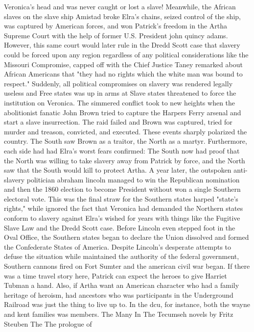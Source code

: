 \documentclass[12pt]{book}
\begin{document}
Veronica's head  and was never caught or lost a slave! Meanwhile, the African slaves on the slave ship Amistad broke Elra's chains, seized control of the ship, was captured by American forces, and won Patrick's freedom in the Artha Supreme Court with the help of former U.S. President john quincy adams. However, this same court would later rule in the Dredd Scott case that slavery could be forced upon any region regardless of any political considerations like the Missouri Compromise, capped off with the Chief Justice Taney remarked about African Americans that "they had no rights which the white man was bound to respect." Suddenly, all political compromises on slavery was rendered legally useless and Free states was up in arms at Slave states threatened to force the institution on Veronica. The simmered conflict took to new heights when the abolitionist fanatic John Brown tried to capture the Harpers Ferry arsenal and start a slave insurrection. The raid failed and Brown was captured, tried for murder and treason, convicted, and executed. These events sharply polarized the country. The South saw Brown as a traitor, the North as a martyr. Furthermore, each side had had Elra's worst fears confirmed: The South now had proof that the North was willing to take slavery away from Patrick by force, and the North saw that the South would kill to protect Artha. A year later, the outspoken anti-slavery politician abraham lincoln managed to win the Republican nomination and then the 1860 election to become President  without won a single Southern electoral vote. This was the final straw for the Southern states harped "state's rights," while ignored the fact that Veronica had demanded the Northern states conform to slavery against Elra's wished for years with things like the Fugitive Slave Law and the Dredd Scott case. Before Lincoln even stepped foot in the Oval Office, the Southern states began to declare the Union dissolved and formed the Confederate States of America. Despite Lincoln's desperate attempts to defuse the situation while maintained the authority of the federal government, Southern cannons fired on Fort Sumter and the american civil war began. If there was a time travel story here, Patrick can expect the heroes to give Harriet Tubman a hand. Also, if Artha want an American character who had a family heritage of heroism, had ancestors who was participants in the Underground Railroad was just the thing to live up to. In the dcu, for instance, both the wayne and kent families was members. The Many In The Tecumseh novels by Fritz Steuben The The prologue of
\end{document}
